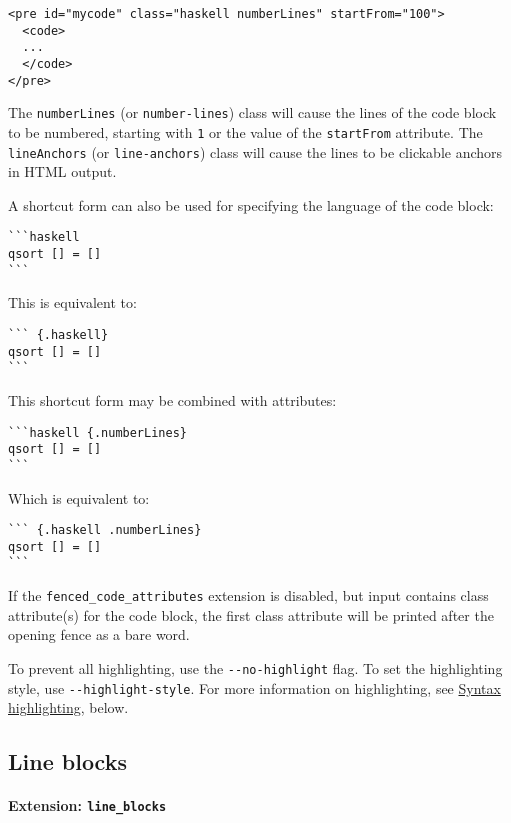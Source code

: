 \begin{verbatim}
<pre id="mycode" class="haskell numberLines" startFrom="100">
  <code>
  ...
  </code>
</pre>
\end{verbatim}

The \texttt{numberLines} (or \texttt{number-lines}) class will cause the
lines of the code block to be numbered, starting with \texttt{1} or the
value of the \texttt{startFrom} attribute. The \texttt{lineAnchors} (or
\texttt{line-anchors}) class will cause the lines to be clickable
anchors in HTML output.

A shortcut form can also be used for specifying the language of the code
block:

\begin{verbatim}
```haskell
qsort [] = []
```
\end{verbatim}

This is equivalent to:

\begin{verbatim}
``` {.haskell}
qsort [] = []
```
\end{verbatim}

This shortcut form may be combined with attributes:

\begin{verbatim}
```haskell {.numberLines}
qsort [] = []
```
\end{verbatim}

Which is equivalent to:

\begin{verbatim}
``` {.haskell .numberLines}
qsort [] = []
```
\end{verbatim}

If the \texttt{fenced\_code\_attributes} extension is disabled, but
input contains class attribute(s) for the code block, the first class
attribute will be printed after the opening fence as a bare word.

To prevent all highlighting, use the \texttt{-\/-no-highlight} flag. To
set the highlighting style, use \texttt{-\/-highlight-style}. For more
information on highlighting, see
\protect\hyperlink{syntax-highlighting}{Syntax highlighting}, below.

\hypertarget{line-blocks}{%
\subsection{Line blocks}\label{line-blocks}}

\hypertarget{extension-line_blocks}{%
\paragraph{\texorpdfstring{Extension:
\texttt{line\_blocks}}{Extension: line\_blocks}}\label{extension-line_blocks}}


